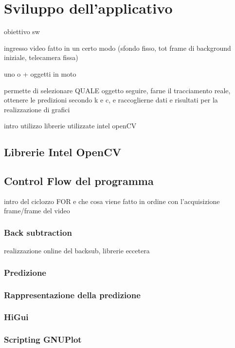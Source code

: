 
\section{Sviluppo dell'applicativo}
obiettivo sw

ingresso video fatto in un certo modo (sfondo fisso, tot frame di background iniziale, telecamera fissa)

uno o + oggetti in moto

permette di selezionare QUALE oggetto seguire, farne il tracciamento reale, ottenere le predizioni secondo k e c, e raccoglierne dati e risultati per la realizzazione di grafici

intro utilizzo librerie utilizzate intel openCV
\subsection{Librerie Intel OpenCV}

\subsection{Control Flow del programma}
intro del ciclozzo FOR e che cosa viene fatto in ordine con l'acquisizione frame/frame del video

\subsubsection{Back subtraction}
realizzazione online del backsub, librerie eccetera
\subsubsection{Predizione}
\subsubsection{Rappresentazione della predizione}
\subsubsection{HiGui}
\subsubsection{Scripting GNUPlot}

